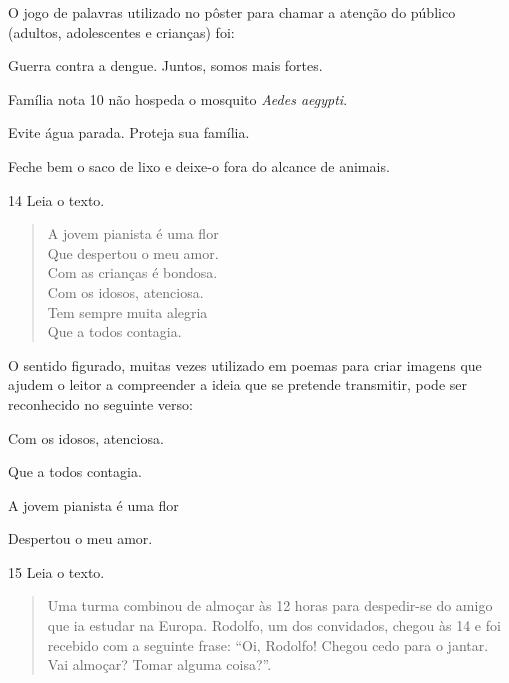 
O jogo de palavras utilizado no pôster para chamar a atenção do público
(adultos, adolescentes e crianças) foi:

\begin{escolha}
\item Guerra contra a dengue. Juntos, somos mais fortes.

\item Família nota 10 não hospeda o mosquito \emph{Aedes aegypti}.

\item Evite água parada. Proteja sua família.

\item Feche bem o saco de lixo e deixe-o fora do alcance de animais.
\end{escolha}


\num{14} Leia o texto.

\begin{verse}
A jovem pianista é uma flor\\
Que despertou o meu amor.\\
Com as crianças é bondosa.\\
Com os idosos, atenciosa.\\
Tem sempre muita alegria\\
Que a todos contagia.\\
\end{verse}

O sentido figurado, muitas vezes utilizado em poemas para criar imagens
que ajudem o leitor a compreender a ideia que se pretende transmitir,
pode ser reconhecido no seguinte verso:

\begin{escolha}
\item Com os idosos, atenciosa.

\item Que a todos contagia.

\item A jovem pianista é uma flor

\item Despertou o meu amor.
\end{escolha}



\num{15} Leia o texto.

\begin{quote}
Uma turma combinou de almoçar às 12 horas para despedir-se do amigo que
ia estudar na Europa. Rodolfo, um dos convidados, chegou às 14 e foi
recebido com a seguinte frase: ``Oi, Rodolfo! Chegou cedo para o jantar.
Vai almoçar? Tomar alguma coisa?''.

\end{quote}

